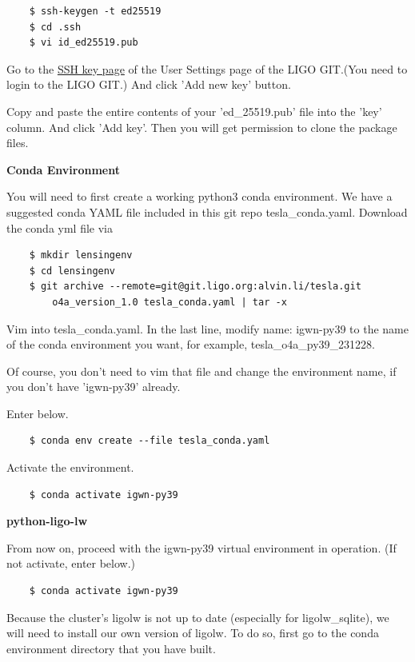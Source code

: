\begin{verbatim}
    $ ssh-keygen -t ed25519
    $ cd .ssh
    $ vi id_ed25519.pub
\end{verbatim}

Go to the \href{https://git.ligo.org/-/user_settings/ssh_keys}{SSH key page} of the User Settings page of the LIGO GIT.(You need to login to the LIGO GIT.) And click 'Add new key' button.

Copy and paste the entire contents of your 'ed\_25519.pub' file into the 'key' column. And click 'Add key'. Then you will get permission to clone the package files.

\textbf{Conda Environment}

You will need to first create a working python3 conda environment. We have a suggested conda YAML file included in this git repo tesla\_conda.yaml. Download the conda yml file via

\begin{verbatim}
    $ mkdir lensingenv
    $ cd lensingenv
    $ git archive --remote=git@git.ligo.org:alvin.li/tesla.git
        o4a_version_1.0 tesla_conda.yaml | tar -x
\end{verbatim}

Vim into tesla\_conda.yaml. In the last line, modify name: igwn-py39 to the name of the conda environment you want, for example, tesla\_o4a\_py39\_231228.

Of course, you don't need to vim that file and change the environment name, if you don't have 'igwn-py39' already.

Enter below.

\begin{verbatim}
    $ conda env create --file tesla_conda.yaml
\end{verbatim}

Activate the environment.

\begin{verbatim}
    $ conda activate igwn-py39
\end{verbatim}

\textbf{python-ligo-lw}

From now on, proceed with the igwn-py39 virtual environment in operation. (If not activate, enter below.)

\begin{verbatim}
    $ conda activate igwn-py39
\end{verbatim}

Because the cluster's ligolw is not up to date (especially for ligolw\_sqlite), we will need to install our own version of ligolw. To do so, first go to the conda environment directory that you have built.

